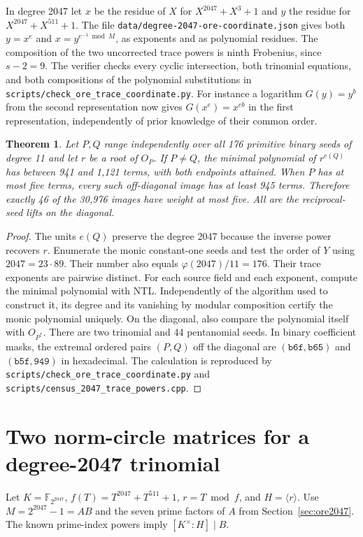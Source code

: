 \documentclass[11pt]{article}
\newtheorem{theorem}{Theorem}
\begin{document}
In degree 2047 let \(x\) be the residue of \(X\) for \(X^{2047}+X^3+1\)
and \(y\) the residue for \(X^{2047}+X^{511}+1\). The file
\nolinkurl{data/degree-2047-ore-coordinate.json} gives both \(y=x^e\)
and \(x=y^{e^{-1}\bmod M}\), as exponents and as polynomial residues.
The composition of the two uncorrected trace powers is ninth Frobenius,
since \(s-2=9\). The verifier checks every cyclic intersection, both
trinomial equations, and both compositions of the polynomial
substitutions in \nolinkurl{scripts/check_ore_trace_coordinate.py}.
For instance a logarithm \(G(y)=y^b\) from the second representation
now gives \(G(x^e)=x^{eb}\) in the first representation, independently
of prior knowledge of their common order.

\begin{theorem}
Let \(P,Q\) range independently over all 176 primitive binary seeds
of degree 11 and let \(r\) be a root of \(O_P\).
If \(P\ne Q\), the minimal polynomial of \(r^{e(Q)}\) has between
941 and 1,121 terms, with both endpoints attained. When \(P\) has
at most five terms, every such off-diagonal image has at least 945
terms. Therefore exactly 46 of the 30,976 images have weight at
most five. All are the reciprocal-seed lifts on the diagonal.
\end{theorem}
\begin{proof}
The units \(e(Q)\) preserve the degree 2047 because the inverse power
recovers \(r\). Enumerate the monic constant-one seeds and test the
order of \(Y\) using \(2047=23\cdot89\). Their number also equals
\(\varphi(2047)/11=176\). Their trace exponents are pairwise distinct.
For each source field and each exponent, compute the minimal polynomial
with NTL. Independently of the algorithm used to construct it, its
degree and its vanishing by modular composition certify the monic
polynomial uniquely. On the diagonal, also compare the polynomial
itself with \(O_{P^*}\). There are two trinomial and 44 pentanomial
seeds. In binary coefficient masks, the extremal ordered pairs
\((P,Q)\) off the diagonal are \((\mathtt{b6f},\mathtt{b65})\) and
\((\mathtt{b5f},\mathtt{949})\) in hexadecimal. The calculation is
reproduced by \nolinkurl{scripts/check_ore_trace_coordinate.py}
and \nolinkurl{scripts/census_2047_trace_powers.cpp}.
\end{proof}


\section{Two norm-circle matrices for a degree-2047 trinomial}
\label{sec:ore-circles}
Let \(K=\mathbb F_{2^{2047}}\), \(f(T)=T^{2047}+T^{511}+1\),
\(r=T\bmod f\), and \(H=\langle r\rangle\). Use \(M=2^{2047}-1=AB\)
and the seven prime factors of \(A\) from Section~\ref{sec:ore2047}.
The known prime-index powers imply \([K^\times:H]\mid B\).
\end{document}

